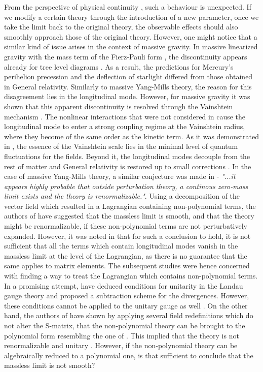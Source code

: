 \documentclass{article}
\begin{document}
From the perspective of physical continuity \cite{BassSch}, such a behaviour is unexpected. If we modify a certain theory through the introduction of a new parameter, once we take the limit back to the original theory, the observable effects should also smoothly approach those of the original theory. However, one might notice that a similar kind of issue arises in the context of massive gravity. In massive linearized gravity with the mass term of the Fierz-Pauli form \cite{FierszPauli}, the discontinuity appears already for tree level diagrams \cite{vDVZ,Zakharov, Iwasaki}. As a result, the predictions for Mercury's perihelion precession and the deflection of starlight differed from those obtained in General relativity. Similarly to massive Yang-Mills theory, the reason for this disagreement lies in the longitudinal mode. However, for massive gravity it was shown that this apparent discontinuity is resolved through the Vainshtein mechanism \cite{VainshteinMeh, PertNep}. The nonlinear interactions that were not considered in \cite{vDVZ,Zakharov, Iwasaki} cause the longitudinal mode to enter a strong coupling regime at the Vainshtein radius, where they become of the same order as the kinetic term. As it was demonstrated in \cite{Mimetic}, the essence of the Vainshtein scale lies in the minimal level of quantum fluctuations for the fields. Beyond it, the longitudinal modes decouple from the rest of matter and General relativity is restored up to small corrections \cite{Gruzinov}. In the case of massive Yang-Mills theory, a similar conjecture was made in \cite{Vainshtein} - \textit{"...it appears highly probable that outside perturbation theory, a continous zero-mass limit exists and the theory is renormalizable."}. Using a decomposition of the vector field which resulted in a Lagrangian containing non-polynomial terms, the authors of \cite{Vainshtein} have suggested that the massless limit is smooth, and that the theory might be renormalizable, if these non-polynomial terms are not perturbatively expanded. However, it was noted in \cite{Slavnov1972} that for such a conclusion to hold, it is not sufficient that all the terms which contain longitudinal modes vanish in the massless limit at the level of the Lagrangian, as there is no guarantee that the same applies to matrix elements. The subsequent studies were hence concerned with finding a way to treat the Lagrangian which contains non-polynomial terms. In a promising attempt, \cite{QuadriUnit,Ferrari, QuadriOneloop} have deduced conditions for unitarity in the Landau gauge theory and proposed a subtraction scheme for the divergences. However, these conditions cannot be applied to the unitary gauge as well \cite{Quad}. On the other hand, the authors of \cite{Dragon} have shown by applying several field redefinitions which do not alter the S-matrix, that the non-polynomial theory can be brought to the polynomial form resembling the one of \cite{Salam}. This implied that the theory is not renormalizable and unitary \cite{Ruegg}. However, if the non-polynomial theory can be algebraically reduced to a polynomial one, is that sufficient to conclude that the massless limit is not smooth? 
\end{document}
